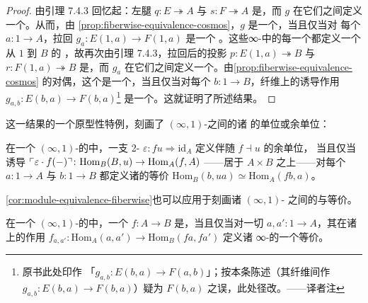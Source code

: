 \begin{proof}
由引理 7.4.3 回忆起：左腿 $q\colon E\twoheadrightarrow A$ 与
$s\colon F\twoheadrightarrow A$ 是\trCocartesianFibration，而\trFunctor{} $g$
在它们之间定义一个\trCartesianFunctor。从而，由%
\cref{prop:fiberwise-equivalence-cosmos}，$g$ 是一个\trEquivalence，当且仅当对
每个\trElement{} $a\colon 1\to A$，拉回 $g_{a}\colon E(1,a)\to F(1,a)$ 是一个%
\trEquivalence。这些∞-\trCategory{}中的每一个都定义一个从 $1$ 到 $B$ 的%
\trModule，故再次由引理 7.4.3，拉回后的投影 $p\colon E(1,a)\twoheadrightarrow B$
与 $r\colon F(1,a)\twoheadrightarrow B$ 是\trCartesianFibration{}，而 $g_{a}$
在它们之间定义一个\trCartesianFunctor。由\cref{prop:fiberwise-equivalence-cosmos}
的对偶，这个\trFunctor{}是一个\trEquivalence，当且仅当对每个\trElement{}
$b\colon 1\to B$，纤维上的诱导作用
$g_{a,b}\colon E(b,a)\to F(b,a)$\footnote{原书此处印作
「$g_{a,b}\colon E(b,a)\to F(a,b)$」；按本条陈述（其纤维间\trFunctor{}作
$g_{a,b}\colon E(b,a)\to F(b,a)$）疑为 $F(b,a)$ 之误，此处径改。——译者注}
是一个\trEquivalence。这就证明了所述结果。
\end{proof}

这一结果的一个原型性特例，刻画了 $(\infty,1)$-\trCategory{}之间的诸%
\trAdjunction{}的单位或余单位：

\begin{corollary}\label{cor:counit-mapping-equivalences}
在一个 $(\infty,1)$-\trCategory{}的\trInfinityCosmos{}中，一支 2-\trCell{}
$\varepsilon\colon fu\Rightarrow\mathrm{id}_{A}$ 定义伴随 $f\dashv u$ 的余单位，
当且仅当诱导\trFunctor{}
$\ulcorner\varepsilon\cdot f(-)\urcorner\colon\mathrm{Hom}_{B}(B,u)\to\mathrm{Hom}_{A}(f,A)$
——居于 $A\times B$ 之上——对每个\trElement{} $a\colon 1\to A$ 与
$b\colon 1\to B$ 都定义诸\trMappingSpace{}的等价
$\mathrm{Hom}_{B}(b,ua)\simeq\mathrm{Hom}_{A}(fb,a)$。
\end{corollary}

\cref{cor:module-equivalence-fiberwise}也可以应用于刻画诸 $(\infty,1)$-%
\trCategory{}之间的\trFullyFaithful{}\trFunctor{}与等价。

\begin{proposition}\label{prop:fully-faithful-pointwise}
在一个 $(\infty,1)$-\trCategory{}的\trInfinityCosmos{}中，一个\trFunctor{}
$f\colon A\to B$ 是\trFullyFaithful，当且仅当对一切\trElement{}
$a,a'\colon 1\to A$，其在诸\trMappingSpace{}上的作用
$f_{a,a'}\colon\mathrm{Hom}_{A}(a,a')\to\mathrm{Hom}_{B}(fa,fa')$ 定义诸%
\trDiscrete{}∞-\trCategory{}的一个等价。
\end{proposition}

